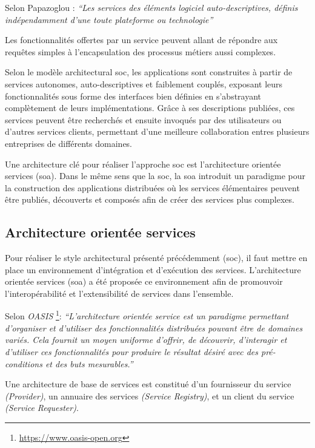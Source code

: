   Selon Papazoglou \cite{papazoglou2003service}: \textit{``Les
    services des éléments logiciel auto-descriptives, définis
    indépendamment d'une toute plateforme ou technologie''}\bigskip

  Les fonctionnalités offertes par un service peuvent allant de
  répondre aux requêtes simples à l'encapsulation des processus
  métiers aussi complexes.\medskip

  Selon le modèle architectural \acrshort{soc}, les applications sont
  construites à partir de services autonomes, auto-descriptives et
  faiblement couplés, exposant leurs fonctionnalités sous forme des
  interfaces bien définies en s'abstrayant complètement de leurs
  implémentations. Grâce à ses descriptions publiées, ces services
  peuvent être recherchés et ensuite invoqués par des utilisateurs ou
  d'autres services clients, permettant d'une meilleure collaboration
  entres plusieurs entreprises de différents domaines.\medskip

  Une architecture clé pour réaliser l'approche \acrshort{soc} est
  l'architecture orientée services (\acrshort{soa}).  Dans le même
  sens que la \acrshort{soc}, la \acrshort{soa} introduit un paradigme
  pour la construction des applications distribuées où les services
  élémentaires peuvent être publiés, découverts et composés afin de
  créer des services plus complexes.

  \subsection{Architecture orientée services}
  \label{sec:soa}

  Pour réaliser le style architectural présenté précédemment
  (\acrshort{soc}), il faut mettre en place un environnement
  d'intégration et d'exécution des services. L'architecture orientée
  services (\acrshort{soa}) a été proposée ce environnement afin de
  promouvoir l'interopérabilité et l'extensibilité de services dans
  l'ensemble.\bigskip

  Selon \textit{OASIS} \footnote{\url{https://www.oasis-open.org}}:
  \textit{``L'architecture orientée service est un paradigme
    permettant d'organiser et d'utiliser des fonctionnalités
    distribuées pouvant être de domaines variés. Cela fournit un moyen
    uniforme d'offrir, de découvrir, d'interagir et d'utiliser ces
    fonctionnalités pour produire le résultat désiré avec des
    pré-conditions et des buts mesurables.''}\bigskip

  Une architecture de base de services
  \cite{gottschalk2002introduction} est constitué d'un fournisseur du
  service \textit{(Provider)}, un annuaire des services
  \textit{(Service Registry)}, et un client du service
  \textit{(Service Requester)}.

